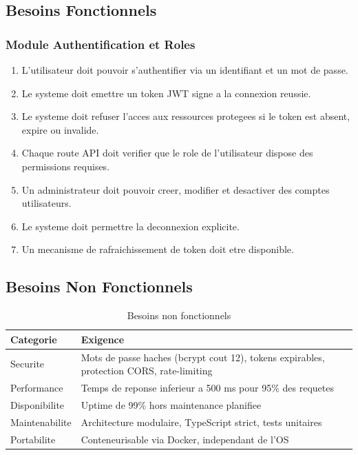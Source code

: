 \documentclass[12pt,a4paper]{report}
\begin{document}
\subsection{Besoins Fonctionnels}

\subsubsection{Module Authentification et Roles}

\begin{enumerate}
  \item L'utilisateur doit pouvoir s'authentifier via un identifiant et
        un mot de passe.
  \item Le systeme doit emettre un token JWT signe a la connexion reussie.
  \item Le systeme doit refuser l'acces aux ressources protegees si le
        token est absent, expire ou invalide.
  \item Chaque route API doit verifier que le role de l'utilisateur
        dispose des permissions requises.
  \item Un administrateur doit pouvoir creer, modifier et desactiver des
        comptes utilisateurs.
  \item Le systeme doit permettre la deconnexion explicite.
  \item Un mecanisme de rafraichissement de token doit etre disponible.
\end{enumerate}

\subsection{Besoins Non Fonctionnels}

\begin{table}[H]
\centering
\caption{Besoins non fonctionnels}
\begin{tabular}{lp{9cm}}
\toprule
\textbf{Categorie} & \textbf{Exigence} \\
\midrule
Securite       & Mots de passe haches (bcrypt cout 12), tokens
                 expirables, protection CORS, rate-limiting \\
Performance    & Temps de reponse inferieur a 500 ms pour 95\% des
                 requetes \\
Disponibilite  & Uptime de 99\% hors maintenance planifiee \\
Maintenabilite & Architecture modulaire, TypeScript strict, tests
                 unitaires \\
Portabilite    & Conteneurisable via Docker, independant de l'OS \\
\bottomrule
\end{tabular}
\end{table}
\end{document}
